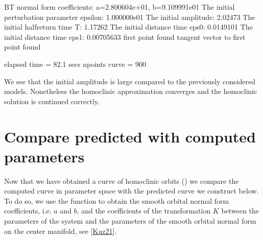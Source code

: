 \documentclass[letterpaper,10pt,english]{jupyterBook}
\begin{document}
\begin{sphinxVerbatim}[commandchars=\\\{\}]
\PYG{p}{[}\PYG{p}{]}
\PYG{p}{[}\PYG{p}{]}
\end{sphinxVerbatim}

\begin{sphinxVerbatim}[commandchars=\\\{\}]
BT normal form coefficients:
a=\PYGZhy{}2.800604e+01,	 b=9.109991e\PYGZhy{}01
The initial perturbation parameter epsilon:  1.000000e\PYGZhy{}01
The initial amplitude: 2.02473
The initial half\PYGZhy{}return time T: 1.17262
The initial distance time eps0: 0.0149101
The initial distance time eps1: 0.00705633
first point found
tangent vector to first point found

elapsed time  = 82.1 secs
npoints curve = 900
\end{sphinxVerbatim}

\sphinxAtStartPar
We see that the initial amplitude is large compared to the previously
considered models. Nonetheless the homoclinic approximation converges and the
homoclinic solution is continued correctly.


\section{Compare predicted with computed parameters}
\label{\detokenize{IFOC:compare-predicted-with-computed-parameters}}
\sphinxAtStartPar
Now that we have obtained a curve of homoclinic orbits () we
compare the computed curve in parameter space with the predicted curve we
construct below. To do so, we use the function  to obtain the
smooth orbital normal form coefficients, i.e. \(a\) and \(b\), and the coefficients
of the transformation \(K\) between the parameters of the system and the parameters
of the smooth orbital normal form on the center manifold, see
{[}\hyperlink{cite.references:id3}{Kuz21}{]}.
\end{document}
